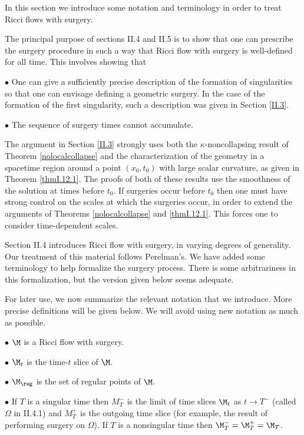 In this section we introduce some notation and terminology in order to
treat Ricci flows with surgery.

The principal purpose of sections II.4 and II.5 is to show that
one can prescribe the surgery procedure in such a way that Ricci flow
with surgery is well-defined for all time.  This involves showing
that

$\bullet$ One can give a sufficiently precise description of
the formation of singularities so that one can envisage defining a geometric
surgery.
In the case of the formation of the first singularity,
such a description was given in Section \ref{II.3}.

$\bullet$ The sequence of surgery times cannot accumulate.

\noindent
The argument in Section \ref{II.3} strongly uses both the $\kappa$-noncollapsing
result
of Theorem \ref{nolocalcollapse} and the characterization
of the geometry in a spacetime region around a point $(x_0, t_0)$ with
large scalar curvature, as given in Theorem \ref{thmI.12.1}.
The proofs of both of these results use the
smoothness of the solution at times before $t_0$. If surgeries occur
before $t_0$ then one must have strong control on the scales at which the
surgeries occur, in order to extend the arguments of Theorems
\ref{nolocalcollapse} and \ref{thmI.12.1}.
This forces one to consider time-dependent scales.

Section II.4 introduces Ricci flow with surgery, in varying degrees of
generality. Our treatment of this material follows Perelman's.
We have added some terminology to help formalize the surgery process.
There is some arbitrariness in this formalization, but the version given
below seems adequate.

For later  use, we now summarize the relevant notation
that we introduce.  More precise  definitions will be given below.
We will avoid using new notation as much as possible.

$\bullet$ $\M$ is a Ricci flow with surgery.

$\bullet$ $\M_t$ is the time-$t$ slice of $\M$.

$\bullet$ $\M_{\reg}$ is the set of regular points of $\M$.

$\bullet$ If $T$ is a singular time then $M_T^-$ is the limit of time slices
$\M_t$ as $t \rightarrow T^-$ (called $\Omega$ in II.4.1) and
$M_T^+$ is the outgoing time slice (for example,  the result of performing
surgery on $\Omega$). If $T$ is a nonsingular time then
$\M_T^- = \M_T^+ = \M_T$.

